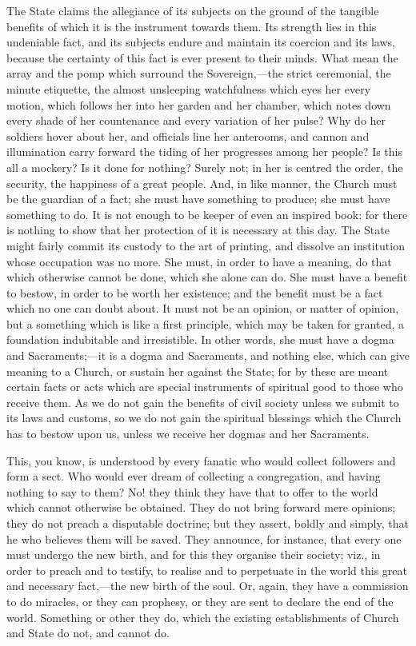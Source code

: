 The State claims the allegiance of its subjects on the ground of
the tangible benefits of which it is the instrument towards them. Its
strength lies in this undeniable fact, and its subjects endure and
maintain its coercion and its laws, because the certainty of this fact
is ever present to their minds. What mean the array and the pomp which
surround the Sovereign,—the strict ceremonial, the minute etiquette,
the almost unsleeping watchfulness which eyes her every motion, which
follows her into her garden and her chamber, which notes down every
shade of her countenance and every variation of her pulse? Why do her
soldiers hover about her, and officials line her anterooms, and cannon
and illumination carry forward the tiding of her progresses among her
people? Is this all a mockery? Is it done for nothing? Surely not; in
her is centred the order, the security, the happiness of a great
people. And, in like manner, the Church must be the guardian of a
fact; she must have something to produce; she must have something to
do. It is not enough to be keeper of even an inspired book: for there
is nothing to show that her protection of it is necessary at this day.
The State might fairly commit its custody to the art of printing, and
dissolve an institution whose occupation was no more. She must, in
order to have a meaning, do that which otherwise cannot be done, which
she alone can do. She must have a benefit to bestow, in order to be
worth her existence; and the benefit must be a fact which no one can
doubt about. It must not be an opinion, or matter of opinion, but a
something which is like a first principle, which may be taken for
granted, a foundation indubitable and irresistible. In other words,
she must have a dogma and Sacraments;—it is a dogma and Sacraments,
and nothing else, which can give meaning to a Church, or sustain her
against the State; for by these are meant certain facts or acts which
are special instruments of spiritual good to those who receive them.
As we do not gain the benefits of civil society unless we submit to
its laws and customs, so we do not gain the spiritual blessings which
the Church has to bestow upon us, unless we receive her dogmas and her
Sacraments.

This, you know, is understood by every fanatic who would collect
followers and form a sect. Who would ever dream of collecting a
congregation, and having nothing to say to them? No! they think they
have that to offer to the world which cannot otherwise be obtained.
They do not bring forward mere opinions; they do not preach a
disputable doctrine; but they assert, boldly and simply, that he who
believes them will be saved. They announce, for instance, that every
one must undergo the new birth, and for this they organise their
society; viz., in order to preach and to testify, to realise and to
perpetuate in the world this great and necessary fact,—the new birth
of the soul. Or, again, they have a commission to do miracles, or they
can prophesy, or they are sent to declare the end of the world.
Something or other they do, which the existing establishments of
Church and State do not, and cannot do.

